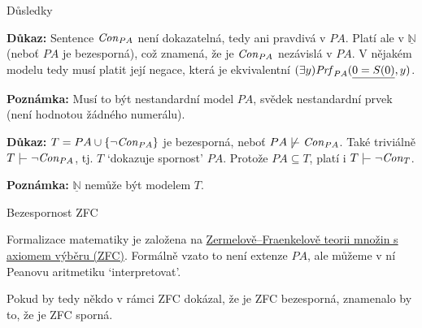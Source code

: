 \documentclass{beamer}
\begin{document}
\begin{frame}{Důsledky}    

    \pause

    \pause
    \textbf{Důkaz:}
        Sentence $\mathit{Con}_{PA}$ není dokazatelná, tedy ani pravdivá v $PA$. Platí ale v $\underline{\mathbb N}$ (neboť $PA$ je bezesporná), což znamená, že je $\mathit{Con}_{PA}$ nezávislá v $PA$. V nějakém modelu tedy musí platit její negace, která je ekvivalentní $(\exists y)\mathit{Prf}_{PA}(\underline{0=S(0)},y)$.            
    \hfill\qedsymbol

    \pause
    \textbf{Poznámka:} Musí to být nestandardní model $PA$, svědek \alert{nestandardní} prvek (není hodnotou žádného numerálu).

    \bigskip

    \pause

    \pause
    \textbf{Důkaz:}
    $T=PA \cup \{\neg \mathit{Con}_{PA}\}$ je \alert{bezesporná}, neboť $PA\not\proves\Con_{PA}$. Také triviálně $T\proves\neg\Con_{PA}$, tj. $T$ `dokazuje spornost' $PA$. Protože $PA\subseteq T$, platí i $T\proves\neg\Con_T$.
    \hfill\qedsymbol

    \pause
    \textbf{Poznámka:} $\underline{\mathbb{N}}$ nemůže být modelem $T$.
    
\end{frame}


\begin{frame}{Bezespornost ZFC}

    \pause
    Formalizace matematiky je založena na \href{https://en.wikipedia.org/wiki/Zermelo\%E2\%80\%93Fraenkel_set_theory}{\alert{Zermelově–Fraenkelově teorii množin s axiomem výběru (ZFC)}}. Formálně vzato to není extenze $PA$, ale můžeme v ní Peanovu aritmetiku `interpretovat'.

    \pause

    \pause
    Pokud by tedy někdo v rámci ZFC dokázal, že je ZFC bezesporná, znamenalo by to, že je ZFC sporná.    

\end{frame}
\end{document}
